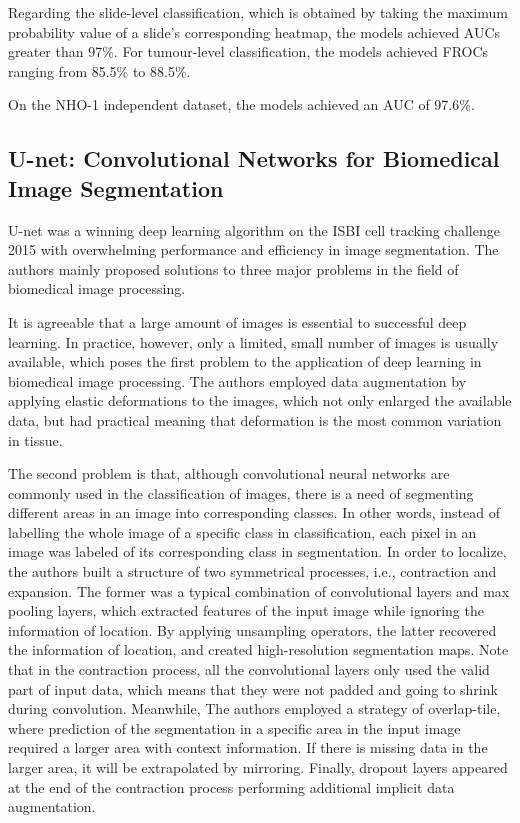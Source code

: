 \documentclass{article}
\begin{document}
Regarding the slide-level classification, which is obtained by taking the maximum probability value of a slide’s corresponding heatmap, the models achieved AUCs greater than 97\%. For tumour-level classification, the models achieved FROCs ranging from 85.5\% to 88.5\%.

On the NHO-1 independent dataset, the models achieved an AUC of 97.6\%.

\subsection{U-net: Convolutional Networks for Biomedical Image Segmentation \cite{Ronneberger2015UNetCN}}

U-net was a winning deep learning algorithm on the ISBI cell tracking challenge 2015 with overwhelming performance and efficiency in image segmentation. The authors mainly proposed solutions to three major problems in the field of biomedical image processing.

It is agreeable that a large amount of images is essential to successful deep learning. In practice, however, only a limited, small number of images is usually available, which poses the first problem to the application of deep learning in biomedical image processing. The authors employed data augmentation by applying elastic deformations to the images, which not only enlarged the available data, but had practical meaning that deformation is the most common variation in tissue.

The second problem is that, although convolutional neural networks are commonly used in the classification of images, there is a need of segmenting different areas in an image into corresponding classes. In other words, instead of labelling the whole image of a specific class in classification, each pixel in an image was labeled of its corresponding class in segmentation. In order to localize, the authors built a structure of two symmetrical processes, i.e., contraction and expansion. The former was a typical combination of convolutional layers and max pooling layers, which extracted features of the input image while ignoring the information of location. By applying unsampling operators, the latter recovered the information of location, and created high-resolution segmentation maps. Note that in the contraction process, all the convolutional layers only used the valid part of input data, which means that they were not padded and going to shrink during convolution. Meanwhile, The authors employed a strategy of overlap-tile, where prediction of the segmentation in a specific area in the input image required a larger area with context information. If there is missing data in the larger area, it will be extrapolated by mirroring. Finally, dropout layers appeared at the end of the contraction process performing additional implicit data augmentation.
\end{document}
